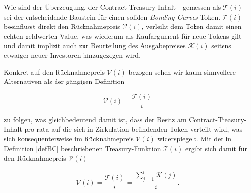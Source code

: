 \begin{Fazit}

Wie sind der Überzeugung, der Contract-Treasury-Inhalt - gemessen als $\mathcal{T} \left( i \right)$ - sei der entscheidende Baustein für einen soliden \textit{Bonding-Curves}-Token. $\mathcal{T} \left( i \right)$ beeinflusst direkt den Rücknahmepreis $\mathcal{V} \left( i \right)$, verleiht dem Token damit einen echten geldwerten Value, was wiederum als Kaufargument für neue Tokens gilt und damit implizit auch zur Beurteilung des Ausgabepreises $\mathcal{K} \left( i \right)$ seitens etwaiger neuer Investoren hinzugezogen wird.

\vspace{0.2cm}

Konkret auf den Rücknahmepreis $\mathcal{V} \left( i \right)$ bezogen sehen wir kaum sinnvollere Alternativen als der gängigen Definition 

\begin{equation*}
\mathcal{V} \left( i \right) = \frac{\mathcal{T} \left( i \right)}{i}
\end{equation*}

zu folgen, was gleichbedeutend damit ist, dass der Besitz am Contract-Treasury-Inhalt pro rata auf die sich in Zirkulation befindenden Token verteilt wird, was sich konsequenterweise im Rücknahmepreis $\mathcal{V} \left( i \right)$ widerspiegelt. Mit der in Definition \ref{defBC} beschriebenen Treasury-Funktion $\mathcal{T} \left( i \right)$ ergibt sich damit für den Rücknahmepreis $\mathcal{V} \left( i \right)$

\begin{equation*}
\mathcal{V} \left( i \right) = \frac{\mathcal{T} \left( i \right)}{i} = \frac{\sum_{j = 1}^{i} \mathcal{K} \left( j \right)}{i}.
\end{equation*} 

\vspace{0.3cm}

\end{Fazit}

\vspace{0.5cm}